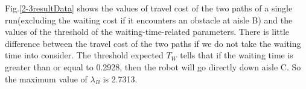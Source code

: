 \documentclass{article}
\begin{document}
Fig.\ref{2-3resultData}  shows the values of travel cost of the two paths of a single run(excluding the waiting cost if it encounters an obstacle at aisle B) and the values of the threshold of the waiting-time-related parameters. There is little difference between the travel cost of the two paths if we do not take the waiting time into consider. The threshold expected $T_{W}$ tells that if the waiting time is greater than or equal to 0.2928, then the robot will go directly down aisle C. So the maximum value of $\lambda_{B}$ is 2.7313.

\newpage


\end{document}
